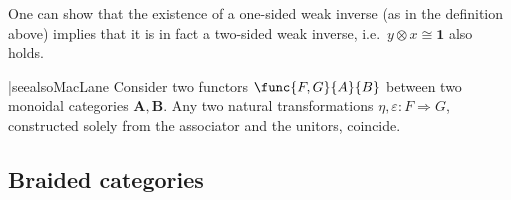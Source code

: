     \begin{remark}
        One can show that the existence of a one-sided weak inverse (as in the definition above) implies that it is in fact a two-sided weak inverse, i.e.~$y\otimes x\cong\mathbf{1}$ also holds.
    \end{remark}

    \begin{theorem}|seealso{MacLane}
        Consider two functors $\func{F,G}{A}{B}$ between two monoidal categories $\mathbf{A},\mathbf{B}$. Any two natural transformations $\eta,\varepsilon:F\Rightarrow G$, constructed solely from the associator and the unitors, coincide.
    \end{theorem}

\subsection{Braided categories}

